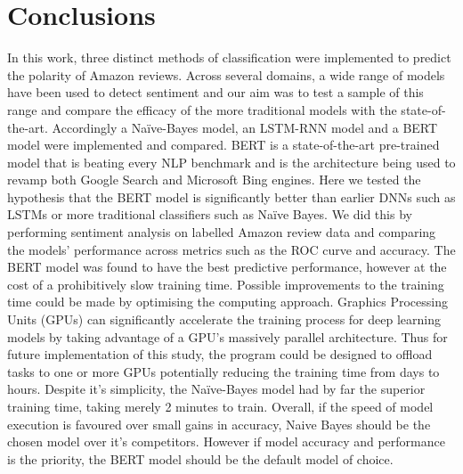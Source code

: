 \documentclass{svproc}
\begin{document}
\section{Conclusions}
In this work, three distinct methods of classification were implemented to predict the polarity of Amazon reviews. Across several domains, a wide range of models have been used to detect sentiment and our aim was to test a sample of this range and compare the efficacy of the more traditional models with the state-of-the-art. Accordingly a Naïve-Bayes model, an LSTM-RNN model and a BERT model were implemented and compared. BERT is a state-of-the-art pre-trained model that is beating every NLP benchmark and is the architecture being used to revamp both Google Search and Microsoft Bing engines. Here we tested the hypothesis that the BERT model is significantly better than earlier DNNs such as LSTMs or more traditional classifiers such as Naïve Bayes. We did this by performing sentiment analysis on labelled Amazon review data and comparing the models' performance across metrics such as the ROC curve and accuracy. The BERT model was found to have the best predictive performance, however at the cost of a prohibitively slow training time. Possible improvements to the training time could be made by optimising the computing approach. Graphics Processing Units (GPUs) can significantly accelerate the training process for deep learning models by taking advantage of a GPU's massively parallel architecture. Thus for future implementation of this study, the program could be designed to offload tasks to one or more GPUs potentially reducing the training time from days to hours. Despite it's simplicity, the Naïve-Bayes model had by far the superior training time, taking merely 2 minutes to train.  
Overall, if the speed of model execution is favoured over small gains in accuracy, Naive Bayes should be the chosen model over it's competitors. However if model accuracy and performance is the priority, the BERT model should be the default model of choice.



\end{document}
